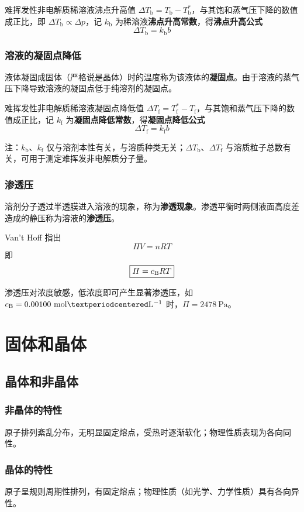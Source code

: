 难挥发性非电解质稀溶液沸点升高值 $\Delta T_{\mathrm{b}}=T_{\mathrm{b}}-T_{\mathrm{b}}^*$，与其饱和蒸气压下降的数值成正比，即 $\Delta T_{\mathrm{b}} \propto \Delta p$，记 $k_{\mathrm{b}}$ 为稀溶液\textbf{沸点升高常数}，得\textbf{沸点升高公式} $$\boxed{\Delta T_{\mathrm{b}}=k_{\mathrm{b}}b}$$

\subsubsection{溶液的凝固点降低}
液体凝固成固体（严格说是晶体）时的温度称为该液体的\textbf{凝固点}。由于溶液的蒸气压下降导致溶液的凝固点低于纯溶剂的凝固点。

难挥发性非电解质稀溶液凝固点降低值 $\Delta T_{\mathrm{f}}=T_{\mathrm{f}}^*-T_{\mathrm{f}}$，与其饱和蒸气压下降的数值成正比，记 $k_{\mathrm{f}}$ 为\textbf{凝固点降低常数}，得\textbf{凝固点降低公式} $$\boxed{\Delta T_{\mathrm{f}}=k_{\mathrm{f}}b}$$

注：$k_{\mathrm{b}}$、$k_{\mathrm{f}}$ 仅与溶剂本性有关，与溶质种类无关；$\Delta T_{\mathrm{b}}$、$\Delta T_{\mathrm{f}}$ 与溶质粒子总数有关，可用于测定难挥发非电解质分子量。

\subsubsection{渗透压}
溶剂分子透过半透膜进入溶液的现象，称为\textbf{渗透现象}。渗透平衡时两侧液面高度差造成的静压称为溶液的\textbf{渗透压}。

Van't Hoff 指出 $$\boxed{\varPi V = nRT}$$ 即 $$\boxed{\varPi = c_{\rm B}RT}$$

渗透压对浓度敏感，低浓度即可产生显著渗透压，如 $c_{\rm B}=0.00100\ \mathrm{mol·L^{-1}}$ 时，$\varPi=2478\ \mathrm{Pa}$。

\section{固体和晶体}
\subsection{晶体和非晶体}
\subsubsection{非晶体的特性}
原子排列紊乱分布，无明显固定熔点，受热时逐渐软化；物理性质表现为各向同性。

\subsubsection{晶体的特性}
原子呈规则周期性排列，有固定熔点；物理性质（如光学、力学性质）具有各向异性。

